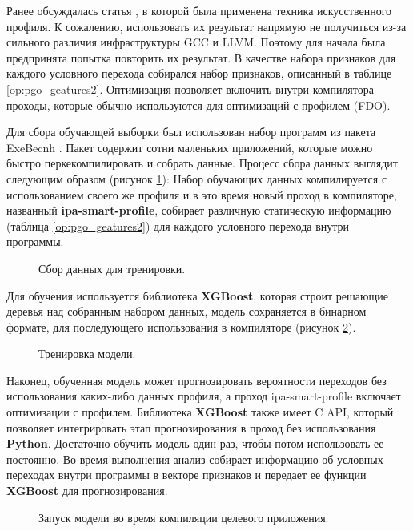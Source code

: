 Ранее обсуждалась статья  \cite{rotem2021profile}, в которой была применена техника искусственного профиля. К сожалению, использовать их результат напрямую не получиться из-за сильного различия инфраструктуры  GCC и LLVM. Поэтому для начала была предпринята попытка повторить их результат. В качестве набора признаков для каждого условного перехода собирался набор признаков, описанный в таблице \ref{op:pgo_geatures2}. Оптимизация позволяет включить внутри компилятора проходы, которые обычно используются для оптимизаций с профилем (FDO). 

Для сбора обучающей выборки был использован набор программ из пакета ExeBecnh \cite{armengol2022exebench}. Пакет содержит сотни маленьких приложений, которые можно быстро перкекомпилировать и собрать данные. Процесс сбора данных выглядит следующим образом (рисунок \ref{op:mlpgo1}): Набор обучающих данных компилируется  с использованием своего же профиля и в это время новый проход в компиляторе, названный \textbf{ipa-smart-profile}, собирает различную статическую информацию (таблица \ref{op:pgo_geatures2}) для каждого условного перехода внутри программы. 

\begin{figure}[htbp]
	\centering
	
	\caption{Сбор данных для тренировки.}
	\label{op:mlpgo1}
\end{figure}

Для обучения используется библиотека \textbf{XGBoost}, которая строит решающие деревья над собранным набором данных, модель сохраняется в бинарном формате, для последующего использования в компиляторе (рисунок \ref{op:mlpgo2}).

\begin{figure}[htbp]
	\centering
	
	\caption{Тренировка модели.}
	\label{op:mlpgo2}
\end{figure}
Наконец, обученная модель может прогнозировать вероятности  переходов  без использования каких-либо данных профиля, а проход ipa-smart-profile включает оптимизации с профилем. Библиотека \textbf{XGBoost} также имеет C API, который позволяет интегрировать этап прогнозирования в проход без использования \textbf{Python}. Достаточно обучить модель один раз, чтобы потом использовать ее постоянно. Во время выполнения анализ собирает информацию об условных переходах  внутри программы в векторе признаков и передает ее функции \textbf{XGBoost} для прогнозирования.
\begin{figure}[htbp]
	\centering
	
	\caption{Запуск модели во время компиляции целевого приложения.}
	\label{op:mlpgo3}
\end{figure}

